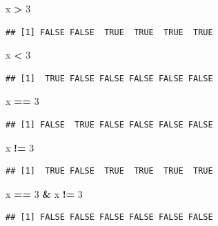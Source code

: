 \documentclass[]{book}
\newenvironment{Shaded}{\begin{snugshade}}{\end{snugshade}}
\newcommand{\DecValTok}[1]{\textcolor[rgb]{0.00,0.00,0.81}{#1}}
\newcommand{\StringTok}[1]{\textcolor[rgb]{0.31,0.60,0.02}{#1}}
\newcommand{\OperatorTok}[1]{\textcolor[rgb]{0.81,0.36,0.00}{\textbf{#1}}}
\newcommand{\NormalTok}[1]{#1}
\theoremstyle{definition}
\theoremstyle{definition}
\theoremstyle{definition}
\theoremstyle{remark}
\begin{document}
\begin{Shaded}
\begin{Highlighting}[]
\NormalTok{x }\OperatorTok{>}\StringTok{ }\DecValTok{3}
\end{Highlighting}
\end{Shaded}

\begin{verbatim}
## [1] FALSE FALSE  TRUE  TRUE  TRUE  TRUE
\end{verbatim}

\begin{Shaded}
\begin{Highlighting}[]
\NormalTok{x }\OperatorTok{<}\StringTok{ }\DecValTok{3}
\end{Highlighting}
\end{Shaded}

\begin{verbatim}
## [1]  TRUE FALSE FALSE FALSE FALSE FALSE
\end{verbatim}

\begin{Shaded}
\begin{Highlighting}[]
\NormalTok{x }\OperatorTok{==}\StringTok{ }\DecValTok{3}
\end{Highlighting}
\end{Shaded}

\begin{verbatim}
## [1] FALSE  TRUE FALSE FALSE FALSE FALSE
\end{verbatim}

\begin{Shaded}
\begin{Highlighting}[]
\NormalTok{x }\OperatorTok{!=}\StringTok{ }\DecValTok{3}
\end{Highlighting}
\end{Shaded}

\begin{verbatim}
## [1]  TRUE FALSE  TRUE  TRUE  TRUE  TRUE
\end{verbatim}

\begin{Shaded}
\begin{Highlighting}[]
\NormalTok{x }\OperatorTok{==}\StringTok{ }\DecValTok{3} \OperatorTok{&}\StringTok{ }\NormalTok{x }\OperatorTok{!=}\StringTok{ }\DecValTok{3}
\end{Highlighting}
\end{Shaded}

\begin{verbatim}
## [1] FALSE FALSE FALSE FALSE FALSE FALSE
\end{verbatim}
\end{document}
